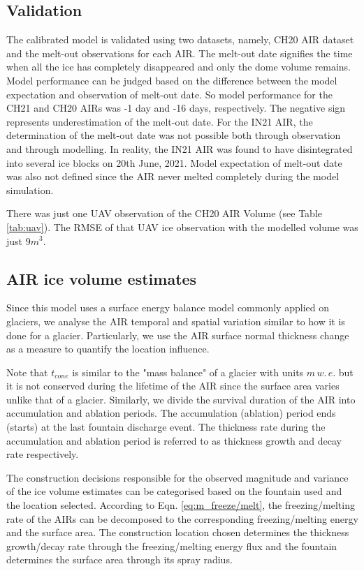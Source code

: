 \documentclass[utf8]{frontiersSCNS}
\begin{document}
\subsection{Validation}

The calibrated model is validated using two datasets, namely, CH20 AIR dataset and the melt-out observations for
each AIR. The melt-out date signifies the time when all the ice has completely disappeared and only the dome volume
remains. Model performance can be judged based on the difference between the model expectation and observation of
melt-out date.  So model performance for the CH21 and CH20 AIRs was -1 day and -16 days, respectively. The negative
sign represents underestimation of the melt-out date. For the IN21 AIR, the determination of the melt-out date was
not possible both through observation and through modelling.  In reality, the IN21 AIR was found to have
disintegrated into several ice blocks on 20th June, 2021.  Model expectation of melt-out date was also not defined
since the AIR never melted completely during the model simulation.

There was just one UAV observation of the CH20 AIR Volume (see Table \ref{tab:uav}).  The RMSE of that UAV ice
observation with the modelled volume was just $9 m^3$.

\subsection{AIR ice volume estimates}

Since this model uses a surface energy balance model commonly applied on glaciers, we analyse the AIR temporal
and spatial variation similar to how it is done for a glacier. Particularly, we use the AIR surface normal
thickness change as a measure to quantify the location influence.

Note that $t_{cone}$ is similar to the "mass balance" of a glacier with units $m \, w.\, e.$ but it is not
conserved during the lifetime of the AIR since the surface area varies unlike that of a glacier.  Similarly, we
divide the survival duration of the AIR into accumulation and ablation periods. The accumulation (ablation)
period ends (starts) at the last fountain discharge event. The thickness rate during the accumulation and
ablation period is referred to as thickness growth and decay rate respectively.

The construction decisions responsible for the observed magnitude and variance of the ice volume estimates can
be categorised based on the fountain used and the location selected. According to Eqn.  \ref{eq:m_freeze/melt},
the freezing/melting rate of the AIRs can be decomposed to the corresponding freezing/melting energy and the
surface area. The construction location chosen determines the thickness growth/decay rate through the
freezing/melting energy flux and the fountain determines the surface area through its spray radius.
\end{document}
